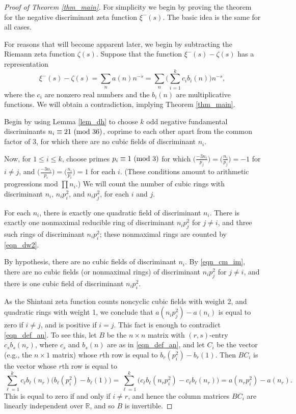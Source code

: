 \documentclass[12pt]{amsart}
\theoremstyle{remark}
\numberwithin{theorem}{section} \numberwithin{equation}{section}
\newcommand{\R}{\mathbb{R}}
\newcommand{\textmod}{{\text {\rm mod}}}
\begin{document}
\begin{proof}[Proof of Theorem \ref{thm_main}]
For simplicity we begin by proving the theorem for the
negative discriminant zeta function $\xi^-(s)$. The basic idea is the same for all cases.

For reasons that will become apparent later, we begin by subtracting the Riemann zeta function $\zeta(s)$.
Suppose that the function $\xi^-(s) - \zeta(s)$ has a representation
\begin{equation}\label{eqn_def_an}
\xi^-(s) - \zeta(s) = \sum_n a(n) n^{-s} =  
\sum_n \bigg( \sum_{i = 1}^k c_i b_i(n) \bigg) n^{-s},
\end{equation}
where the $c_i$ are nonzero real numbers and the $b_i(n)$ are multiplicative functions. We will obtain a contradiction,
implying Theorem \ref{thm_main}.

Begin by using Lemma \ref{lem_dh} to choose $k$ odd negative fundamental discriminants $n_i \equiv 21 \ (\textmod \ 36)$,
coprime to each other apart from the common factor of 3, for which there are no cubic fields of discriminant $n_i$.

Now, for $1 \leq i \leq k$, choose primes $p_i \equiv 1 \ (\textmod \ 3)$ for which 
$\big( \frac{-3 n_i}{p_j} \big) = \big( \frac{n_i}{p_j} \big) = -1$
for $i \neq j$, and $\big( \frac{-3 n_i}{p_i} \big) = \big( \frac{n_i}{p_i} \big) = 1$ for each $i$.
(These conditions amount to arithmetic progressions mod $\prod n_i$.) We will count the number of
cubic rings with discriminant $n_i$, $n_i p_i^2$, and $n_i p_j^2$, for each $i$ and $j$.

For each $n_i$, there is exactly one quadratic field of discriminant $n_i$. There is exactly one nonmaximal
reducible ring of discriminant $n_i p_j^2$ for $j \neq i$, and
three such rings of discriminant $n_i p_i^2$; these nonmaximal rings are counted by \eqref{eqn_dw2}.

By hypothesis, there are no cubic fields of discriminant $n_i$. By \eqref{eqn_cm_im}, there are no
cubic fields (or nonmaximal rings) of discriminant $n_i p_j^2$ for $j \neq i$, and there is one cubic field
of discriminant $n_i p_i^2$.

As the Shintani zeta function counts noncyclic cubic fields with weight 2, and quadratic rings with weight 1,
we conclude that $a(n_i p_j^2) - a(n_i)$ is equal to zero if $i \neq j$, and is positive if $i = j$. This fact 
is enough to contradict \eqref{eqn_def_an}. To see this, 
let $B$ be
the $n \times n$ matrix with $(r, s)$-entry $c_s b_s(n_r)$, where $c_s$ and $b_s(n)$ are as in \eqref{eqn_def_an},
and let $C_i$ be the vector (e.g., the $n \times 1$ matrix) whose $r$th row is equal to $b_r(p_i^2) - b_r(1)$.
Then $B C_i$ is the vector whose $r$th row is equal to 
\begin{equation}
\sum_{\ell = 1}^k c_{\ell} b_{\ell}(n_r) \big(
b_{\ell}(p_i^2) - b_\ell(1) \big) =
\sum_{\ell = 1}^k \Big( c_{\ell} b_{\ell} (n_r p_i^2) - c_{\ell} b_{\ell}(n_r) \Big)
= a(n_r p_i^2) - a(n_r).
\end{equation}
This is equal to zero if and only if $i \neq r$, and hence
the column matrices $B C_i$ are linearly independent over $\R$, and so $B$ is invertible.


\end{proof}
\end{document}
